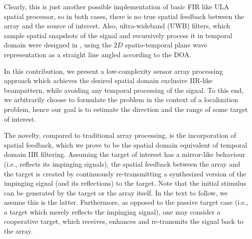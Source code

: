 Clearly, this is just another possible implementation of basic FIR like ULA spatial processor, so in both cases, there is no true spatial feedback between the array and the source of interest.
Also, ultra-wideband (UWB) filters, which sample spatial snapshots of the signal and recursively process it in temporal domain were designed in \cite{Hum2009BeamformingFilters}, using the $2D$ spatio-temporal plane wave representation as a straight line angled according to the DOA.
\par In this contribution, we present a low-complexity sensor array processing approach which achieves the desired spatial domain exclusive IIR-like beampattern, while avoiding any temporal processing of the signal.
To this end, we arbitrarily choose to formulate the problem in the context of a localization problem, hence our goal is to estimate the direction and the range of some target of interest. 
\par The novelty, compared to traditional array processing, is the incorporation of spatial feedback, which we prove to be the spatial domain equivalent of temporal domain IIR filtering.
Assuming the target of interest has a mirror-like behaviour (i.e., reflects its impinging signals), the spatial feedback between the array and the target is created by continuously re-transmitting a synthesized version of the impinging signal (and its reflections) to the target.
Note that the initial stimulus can be generated by the target or the array itself. In the text to follow, we assume this is the latter. 
Furthermore, as opposed to the passive target case (i.e., a target which merely reflects the impinging signal), one may consider a cooperative target, which receives, enhances and re-transmits the signal back to the array. 
